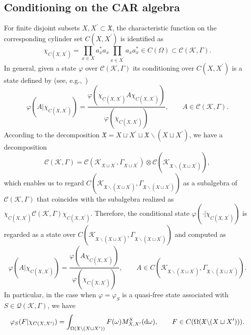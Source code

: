 \documentclass[pdftex]{sigma}
\numberwithin{equation}{section}
\newcommand{\pr}[1]{#1^{\prime}}
\newcommand{\mfrak}[1]{\mathfrak{#1}}
\newcommand{\mcal}[1]{\mathcal{#1}}
\begin{document}
\subsection{Conditioning on the CAR algebra}\label{subsect:conditioning_CAR_alg}
For finite disjoint subsets $X, \pr{X}\subset\mfrak{X}$, the characteristic function on the corresponding cylinder set $C(X,\pr{X})$ is identified as
\begin{equation*}
	\chi_{C(X,\pr{X})}=\prod_{x\in X}a_{x}^{\ast}a_{x} \prod_{x\in \pr{X}} a_{x}a_{x}^{\ast}\in C(\Omega)\subset \mcal{C}(\mcal{K},\Gamma).
\end{equation*}
In general, given a state $\varphi$ over $\mcal{C}(\mcal{K},\Gamma)$ its conditioning over $C(X,\pr{X})$ is a state defined by (see, e.g.,~\cite{RedeiSummers2006})
\begin{equation*}
	\varphi (A|\chi_{C(X,\pr{X})})=\frac{\varphi (\chi_{C(X,\pr{X})}A\chi_{C(X,\pr{X})})}{\varphi (\chi_{C(X,\pr{X})})},\qquad A\in \mcal{C}(\mcal{K},\Gamma).
\end{equation*}
According to the decomposition $\mfrak{X}=X\sqcup \pr{X}\sqcup \mfrak{X}\backslash (X\sqcup\pr{X})$, we have a decomposition
\begin{equation*}
	\mcal{C}(\mcal{K},\Gamma)=\mcal{C}(\mcal{K}_{X\sqcup \pr{X}},\Gamma_{X\sqcup\pr{X}})\otimes \mcal{C}(\mcal{K}_{\mfrak{X}\backslash (X\sqcup\pr{X})}),
\end{equation*}
which enables us to regard $C(\mcal{K}_{\mfrak{X}\backslash (X\sqcup\pr{X})},\Gamma_{\mfrak{X}\backslash (X\sqcup\pr{X})})$ as a subalgebra of $\mcal{C}(\mcal{K},\Gamma)$ that coincides with the subalgebra realized as $\chi_{C(X,\pr{X})}\mcal{C}(\mcal{K},\Gamma)\chi_{C(X,\pr{X})}$.
Therefore, the conditional state $\varphi (\cdot|\chi_{C(X,\pr{X})})$ is regarded as a state over $C(\mcal{K}_{\mfrak{X}\backslash (X\sqcup\pr{X})},\Gamma_{\mfrak{X}\backslash (X\sqcup\pr{X})})$ and computed as
\begin{equation*}
	\varphi (A|\chi_{C(X,\pr{X})})=\frac{\varphi (A\chi_{C(X,\pr{X})})}{\varphi (\chi_{C(X,\pr{X})})},\qquad A\in C(\mcal{K}_{\mfrak{X}\backslash (X\sqcup\pr{X})},\Gamma_{\mfrak{X}\backslash (X\sqcup\pr{X})}).
\end{equation*}
In particular, in the case when $\varphi=\varphi_{S}$ is a quasi-free state associated with $S\in \mcal{Q}(\mcal{K},\Gamma)$, we have
\begin{equation*}
	\varphi_{S}(F|\chi_{C(X,\pr{X})})=\int_{\Omega (\mfrak{X}\backslash (X\sqcup\pr{X}))}F(\omega)M^{S}_{X,\pr{X}}({\rm d}\omega),\qquad F\in C(\Omega (\mfrak{X}\backslash (X\sqcup\pr{X}))).
\end{equation*}
\end{document}
